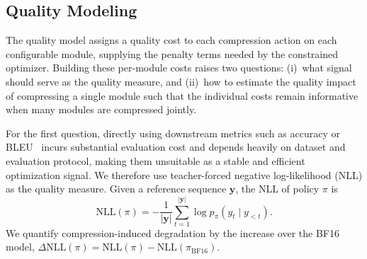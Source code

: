 \documentclass[letterpaper]{article} %
\begin{document}

\subsection{Quality Modeling}

The quality model assigns a quality cost to each compression action on each configurable module, supplying the penalty terms needed by the constrained optimizer. Building these per-module costs raises two questions: (i)~what signal should serve as the quality measure, and (ii)~how to estimate the quality impact of compressing a single module such that the individual costs remain informative when many modules are compressed jointly.

For the first question, directly using downstream metrics such as accuracy or BLEU~\cite{papineni2002bleu} incurs substantial evaluation cost and depends heavily on dataset and evaluation protocol, making them unsuitable as a stable and efficient optimization signal. We therefore use teacher-forced negative log-likelihood (NLL) as the quality measure. Given a reference sequence $\mathbf{y}$, the NLL of policy $\pi$ is
\begin{equation}
\mathrm{NLL}(\pi)
=
-\frac{1}{|\mathbf{y}|}
\sum_{t=1}^{|\mathbf{y}|}
\log p_{\pi}(y_t\mid y_{<t}).
\end{equation}
We quantify compression-induced degradation by the increase over the BF16 model, $\Delta\mathrm{NLL}(\pi)=\mathrm{NLL}(\pi)-\mathrm{NLL}(\pi_{\mathrm{BF16}})$.
\end{document}
